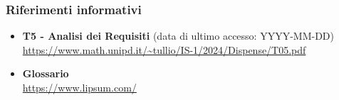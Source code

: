\subsubsection{Riferimenti informativi}
\begin{itemize}
    \item \textbf{T5 - Analisi dei Requisiti} (data di ultimo accesso: YYYY-MM-DD)\\
    \url{https://www.math.unipd.it/~tullio/IS-1/2024/Dispense/T05.pdf}
    
    \item \textbf{Glossario} \\
    \url{https://www.lipsum.com/}
\end{itemize}

